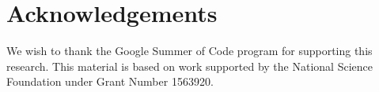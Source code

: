 \section{Acknowledgements}
We wish to thank the Google Summer of Code program for supporting this research. 
%
This material is based on work supported by the National Science Foundation under Grant Number 1563920.
